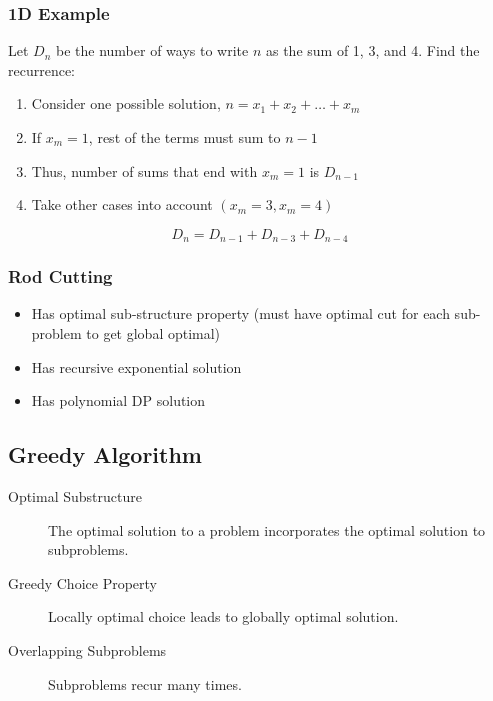 \documentclass{article}
\begin{document}
\begin{multicols*}{2}
    \subsubsection*{1D Example}
    Let \(D_n\) be the number of ways to write \(n\) as the sum of 1, 3, and 4.
    Find the recurrence:
    \begin{enumerate}
        \item Consider one possible solution, \(n = x_1 + x_2 + \dots + x_m\)
        \item If \(x_m = 1\), rest of the terms must sum to \(n - 1\)
        \item Thus, number of sums that end with \(x_m = 1\) is \(D_{n-1}\)
        \item Take other cases into account \((x_m = 3, x_m = 4)\)
    \end{enumerate}
    \begin{equation*}
        D_n = D_{n-1} + D_{n-3} + D_{n-4}
    \end{equation*}

    \subsubsection*{Rod Cutting}
    \begin{itemize}
        \item Has optimal sub-structure property (must have optimal cut for each
              sub-problem to get global optimal)
        \item Has recursive exponential solution
        \item Has polynomial DP solution
    \end{itemize}

    \subsection*{Greedy Algorithm}
    \begin{description}
        \item[Optimal Substructure] The optimal solution to a problem
            incorporates the optimal solution to subproblems.
        \item[Greedy Choice Property] Locally optimal choice leads to globally
            optimal solution.
        \item[Overlapping Subproblems] Subproblems recur many times.
    \end{description}

    \setlength{\leftmargini}{0em}
    \setlength{\columnsep}{2em}


\end{multicols*}
\end{document}
